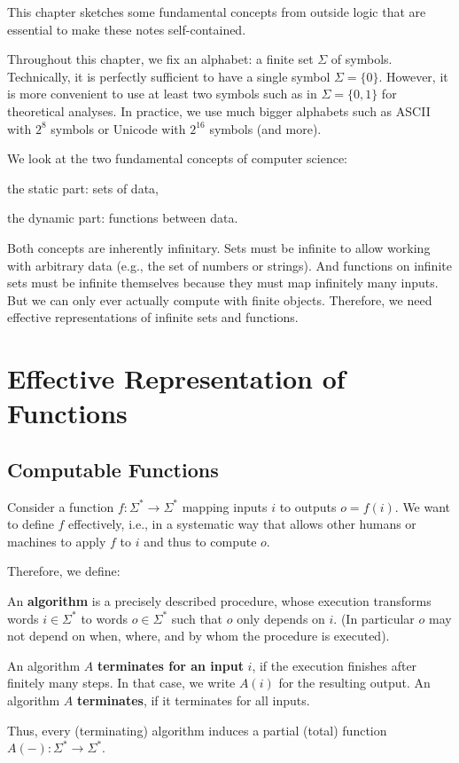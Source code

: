 This chapter sketches some fundamental concepts from outside logic that are essential to make these notes self-contained.

Throughout this chapter, we fix an alphabet: a finite set $\Sigma$ of symbols.
Technically, it is perfectly sufficient to have a single symbol $\Sigma=\{0\}$.
However, it is more convenient to use at least two symbols such as in $\Sigma=\{0,1\}$ for theoretical analyses.
In practice, we use much bigger alphabets such as ASCII with $2^8$ symbols or Unicode with $2^{16}$ symbols (and more).

We look at the two fundamental concepts of computer science:
\begin{compactitem}
 \item the static part: sets of data,
 \item the dynamic part: functions between data.
\end{compactitem}

Both concepts are inherently infinitary.
Sets must be infinite to allow working with arbitrary data (e.g., the set of numbers or strings).
And functions on infinite sets must be infinite themselves because they must map infinitely many inputs.
But we can only ever actually compute with finite objects.
Therefore, we need effective representations of infinite sets and functions.

\section{Effective Representation of Functions}\label{sec:comp:algo}

\subsection{Computable Functions}\label{sec:comp:algo:def}

Consider a function $f:\Sigma^*\to\Sigma^*$ mapping inputs $i$ to outputs $o=f(i)$.
We want to define $f$ effectively, i.e., in a systematic way that allows other humans or machines to apply $f$ to $i$ and thus to compute $o$.

Therefore, we define:

\begin{definition}[Algorithm]\label{def:comp:algo}
An \textbf{algorithm} is a precisely described procedure, whose execution transforms words $i\in\Sigma^*$ to words $o\in\Sigma^*$ such that $o$ only depends on $i$. (In particular $o$ may not depend on when, where, and by whom the procedure is executed).

An algorithm $A$ \textbf{terminates for an input} $i$, if the execution finishes after finitely many steps.
In that case, we write $A(i)$ for the resulting output.
An algorithm $A$ \textbf{terminates}, if it terminates for all inputs.

Thus, every (terminating) algorithm induces a partial (total) function $A(-):\Sigma^*\to\Sigma^*$.
\end{definition}


